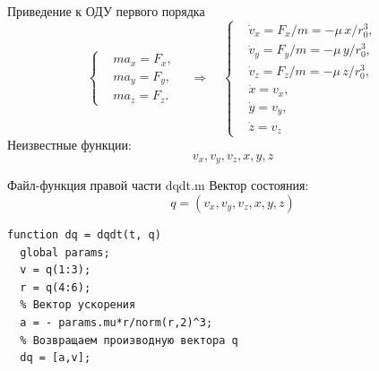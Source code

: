\documentclass[11pt, compress]{beamer}
\begin{document}

\begin{frame}[fragile]{Приведение к ОДУ первого порядка}
$$
\left\{
\begin{aligned}
  & m a_x = F_x, \\
  & m a_y = F_y, \\
  & m a_z = F_z.
\end{aligned}\right. \quad \Rightarrow \quad
\left\{
\begin{aligned}
  & \dot v_x = F_x/m = - \mu \, x / r_0^3, \\
  & \dot v_y = F_y/m = - \mu \, y / r_0^3, \\
  & \dot v_z = F_z/m = - \mu \, z / r_0^3, \\
  & \dot x = v_x, \\
  & \dot y = v_y, \\
  & \dot z = v_z 
\end{aligned}
\right.
$$
Неизвестные функции: 
$$
  v_x, v_y, v_z, x, y, z
$$
\end{frame}

\begin{frame}[fragile]{Файл-функция правой части dqdt.m}
Вектор состояния:
$$
  q = (v_x, v_y, v_z, x, y, z)
$$
\begin{lstlisting}
function dq = dqdt(t, q) 
  global params;
  v = q(1:3);
  r = q(4:6);  
  % Вектор ускорения
  a = - params.mu*r/norm(r,2)^3;
  % Возвращаем производную вектора q
  dq = [a,v];
\end{lstlisting}
\end{frame}
\end{document}
